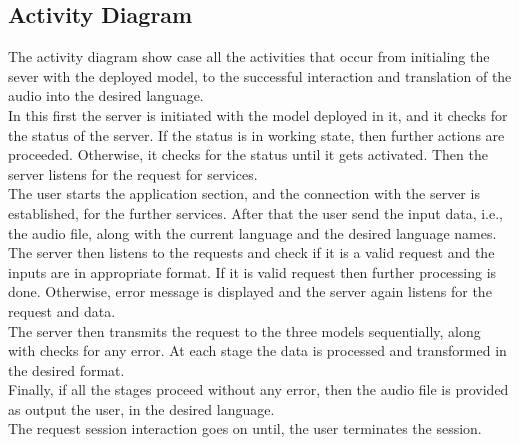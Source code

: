 \subsection{Activity Diagram}
{\normalsize{The activity diagram show case all the activities that occur from initialing the sever with the deployed model, to the successful interaction and translation of the audio into the desired language.
\\
In this first the server is initiated with the model deployed in it, and it checks for the status of the server. If the status is in working state, then further actions are proceeded. Otherwise, it checks for the status until it gets activated. Then the server listens for the request for services.
\\
The user starts the application section, and the connection with the server is established, for the further services. After that the user send the input data, i.e., the audio file, along with the current language and the desired language names. \\
The server then listens to the requests and check if it is a valid request and the inputs are in appropriate format. If it is valid request then further processing is done. Otherwise, error message is displayed and the server again listens for the request and data. \\
The server then transmits the request to the three models sequentially, along with checks for any error. At each stage the data is processed and transformed in the desired format.\\
Finally, if all the stages proceed without any error, then the audio file is provided as output the user, in the desired language. \\ 
The request session interaction goes on until, the user terminates the session. \\ 
}}
\newline
\newline
